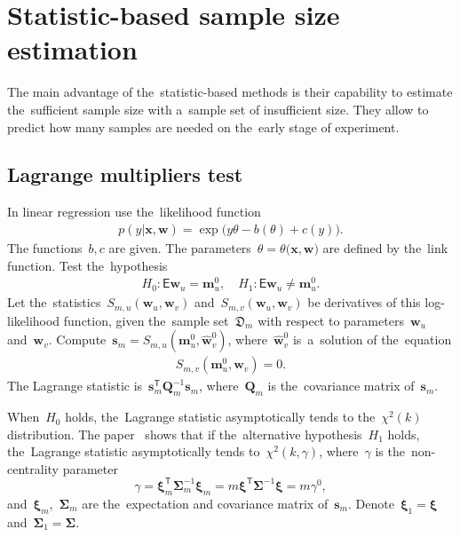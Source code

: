 \documentclass[
11pt,%
tightenlines,%
twoside,%
onecolumn,%
nofloats,%
nobibnotes,%
nofootinbib,%
superscriptaddress,%
noshowpacs,%
centertags]%
{revtex4}
\begin{document}
\section{Statistic-based sample size estimation}
The main advantage of the~statistic-based methods is their
capability  to estimate the~sufficient sample size with a~sample set
of insufficient size. They allow to predict how many samples are
needed on the~early stage of experiment.

\subsection{Lagrange multipliers test}
In linear regression use the~likelihood function
\[
\label{eq:sb:1}
\begin{aligned}
    p(y|\mathbf{x}, \mathbf{w}) = \exp\bigl(y\theta- b(\theta) + c\left(y\right)\bigr).
\end{aligned}
\]
The functions~$b, c$ are given. The
parameters~$\theta=\theta\bigr(\mathbf{x}, \mathbf{w}\bigr)$  are
defined by the~link function. Test the~hypothesis
\[
\label{eq:sb:2}
\begin{aligned}
    H_0: \mathsf{E}\mathbf{w}_{u} = \mathbf{m}^0_{u}, \quad H_1: \mathsf{E}\mathbf{w}_{u} \not= \mathbf{m}^0_{u}.
\end{aligned}
\]
Let the~statistics~$S_{m,u}\left(\mathbf{w}_{u}, \mathbf{w}_{v}\right)$ and~$S_{m,v}\left(\mathbf{w}_{u}, \mathbf{w}_{v}\right)$ be derivatives of this log-likelihood function, given the~sample set~$\mathfrak{D}_{m}$ with respect to parameters~$\mathbf{w}_{u}$ and~$\mathbf{w}_{v}$.
Compute~$\mathbf{s}_{m} = S_{m,u}\left(\mathbf{m}^{0}_{u}, \hat{\mathbf{w}}^{0}_{v}\right)$, where~$\hat{\mathbf{w}}^{0}_{v}$ is~a~solution of the~equation
\[
\label{eq:sb:3}
\begin{aligned}
    S_{m,v}\left(\mathbf{m}^{0}_{u}, \mathbf{w}_{v}\right) = 0.
\end{aligned}
\]
The Lagrange statistic is~$\mathbf{s}^{\mathsf{T}}_{m}\mathbf{Q}_{m}^{-1}\mathbf{s}_{m}$, where~$\mathbf{Q}_{m}$ is the~covariance matrix of~$\mathbf{s}_{m}$.

When~$H_0$ holds, the~Lagrange statistic asymptotically tends to
the~$\chi^2(k)$  distribution. The paper~\cite{self1988} shows that
if the~alternative hypothesis~$H_1$ holds, the~Lagrange statistic
asymptotically tends to~$\chi^2(k,\gamma)$, where~$\gamma$ is
the~non-centrality parameter
\begin{equation}
\label{eq:sb:5}
    \gamma = \bm{\xi}_{m}^{\mathsf{T}}\bm{\Sigma}^{-1}_{m}\bm{\xi}_{m} = m\bm{\xi}^{\mathsf{T}}\bm{\Sigma}^{-1}\bm{\xi}= m\gamma^0,
\end{equation}
and~$\bm{\xi}_{m}$,~$\bm{\Sigma}_{m}$ are
the~expectation and covariance matrix  of~$\mathbf{s}_{m}$.
Denote~$\bm{\xi}_1 = \bm{\xi}$ and~$\bm{\Sigma}_1 = \bm{\Sigma}$.
\end{document}

